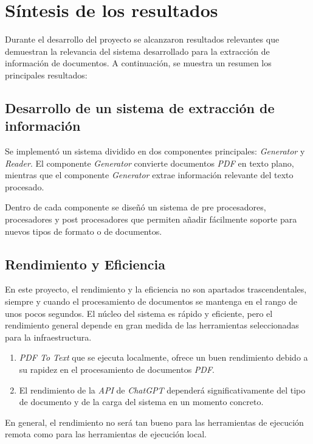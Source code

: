 \section{Síntesis de los resultados}

Durante el desarrollo del proyecto se alcanzaron resultados relevantes que demuestran la relevancia del sistema
desarrollado para la extracción de información de documentos.
A continuación, se muestra un resumen los principales resultados:

\subsection*{Desarrollo de un sistema de extracción de información}

Se implementó un sistema dividido en dos componentes principales: \textit{Generator} y \textit{Reader}.
El componente \textit{Generator} convierte documentos \textit{PDF} en texto plano, mientras que el componente
\textit{Generator} extrae información relevante del texto procesado.

Dentro de cada componente se diseñó un sistema de pre procesadores, procesadores y post procesadores que permiten
añadir fácilmente soporte para nuevos tipos de formato o de documentos.

\subsection*{Rendimiento y Eficiencia}

En este proyecto, el rendimiento y la eficiencia no son apartados trascendentales, siempre y cuando el procesamiento de
documentos se mantenga en el rango de unos pocos segundos.
El núcleo del sistema es rápido y eficiente, pero el rendimiento general depende en gran medida de las herramientas
seleccionadas para la infraestructura.

\begin{enumerate}
    \item \textit{PDF To Text} que se ejecuta localmente, ofrece un buen rendimiento debido a su rapidez en el
    procesamiento de documentos \textit{PDF}.

    \item El rendimiento de la \textit{API} de \textit{ChatGPT} dependerá significativamente del tipo de documento y de
    la carga del sistema en un momento concreto.
\end{enumerate}

En general, el rendimiento no será tan bueno para las herramientas de ejecución remota como para las herramientas
de ejecución local.

